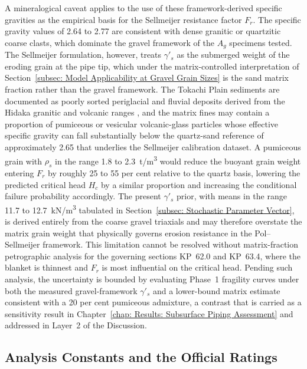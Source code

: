 A mineralogical caveat applies to the use of these framework-derived specific gravities as the empirical basis for the Sellmeijer resistance factor $F_r$. The specific gravity values of 2.64 to 2.77 are consistent with dense granitic or quartzitic coarse clasts, which dominate the gravel framework of the $A_g$ specimens tested. The Sellmeijer formulation, however, treats $\gamma'_s$ as the submerged weight of the eroding grain at the pipe tip, which under the matrix-controlled interpretation of Section~\ref{subsec: Model Applicability at Gravel Grain Sizes} is the sand matrix fraction rather than the gravel framework. The Tokachi Plain sediments are documented as poorly sorted periglacial and fluvial deposits derived from the Hidaka granitic and volcanic ranges \parencite{furuichi_2018}, and the matrix fines may contain a proportion of pumiceous or vesicular volcanic-glass particles whose effective specific gravity can fall substantially below the quartz-sand reference of approximately 2.65 that underlies the Sellmeijer calibration dataset. A pumiceous grain with $\rho_s$ in the range 1.8 to 2.3~t/m\textsuperscript{3} would reduce the buoyant grain weight entering $F_r$ by roughly 25 to 55 per cent relative to the quartz basis, lowering the predicted critical head $H_c$ by a similar proportion and increasing the conditional failure probability accordingly. The present $\gamma'_s$ prior, with means in the range 11.7 to 12.7~kN/m\textsuperscript{3} tabulated in Section~\ref{subsec: Stochastic Parameter Vector}, is derived entirely from the coarse gravel triaxials and may therefore overstate the matrix grain weight that physically governs erosion resistance in the Pol--Sellmeijer framework. This limitation cannot be resolved without matrix-fraction petrographic analysis for the governing sections KP~62.0 and KP~63.4, where the blanket is thinnest and $F_r$ is most influential on the critical head. Pending such analysis, the uncertainty is bounded by evaluating Phase~1 fragility curves under both the measured gravel-framework $\gamma'_s$ and a lower-bound matrix estimate consistent with a 20 per cent pumiceous admixture, a contrast that is carried as a sensitivity result in Chapter~\ref{chap: Results: Subsurface Piping Assessment} and addressed in Layer~2 of the Discussion.

\subsection{Analysis Constants and the Official Ratings}
\label{subsec: Analysis Constants and the Official Ratings}

